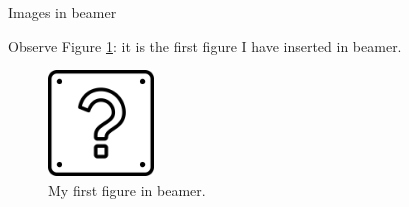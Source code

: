 \documentclass{ctexbeamer}
\begin{document}
\begin{frame}{Images in beamer}

Observe Figure \ref{fig:question}: it is the
first figure I have inserted in beamer.

\begin{figure}
\centering
  \includegraphics[width=0.25\textwidth]{Ques}
  \caption{My first figure in beamer.}
  \label{fig:question}
\end{figure}

\end{frame}
\end{document}
